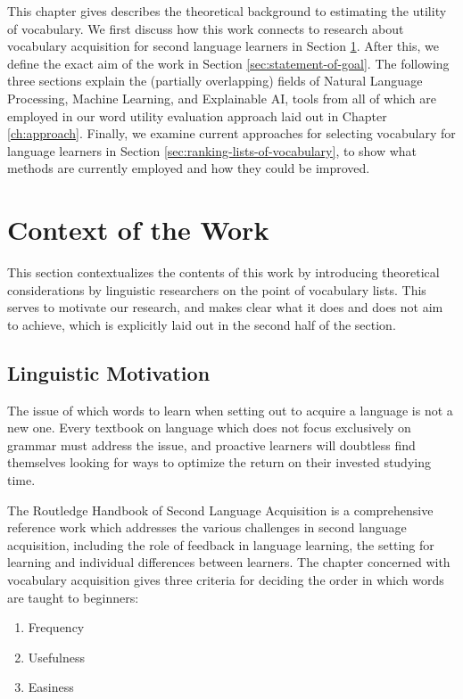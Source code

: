 This chapter gives describes the theoretical background to estimating the utility of vocabulary.
We first discuss how this work connects to research about vocabulary acquisition for second language learners in Section \ref{sec:context-of-work}.
After this, we define the exact aim of the work in Section \ref{sec:statement-of-goal}.
The following three sections explain the (partially overlapping) fields of Natural Language Processing, Machine Learning, and Explainable AI, tools from all of which are employed in our word utility evaluation approach laid out in Chapter \ref{ch:approach}.
Finally, we examine current approaches for selecting vocabulary for language learners in Section \ref{sec:ranking-lists-of-vocabulary}, to show what methods are currently employed and how they could be improved.


\section{Context of the Work} \label{sec:context-of-work}

This section contextualizes the contents of this work by introducing theoretical considerations by linguistic researchers on the point of vocabulary lists.
This serves to motivate our research, and makes clear what it does and does not aim to achieve, which is explicitly laid out in the second half of the section.


\subsection{Linguistic Motivation} \label{sec:linguistic-motivation}
The issue of which words to learn when setting out to acquire a language is not a new one.
Every textbook on language which does not focus exclusively on grammar must address the issue, and proactive learners will doubtless find themselves looking for ways to optimize the return on their invested studying time.

The Routledge Handbook of Second Language Acquisition \cite{liRoutledgeHandbookSecond2022} is a comprehensive reference work which addresses the various challenges in second language acquisition, including the role of feedback in language learning, the setting for learning and individual differences between learners.
The chapter concerned with vocabulary acquisition gives three criteria for deciding the order in which words are taught to beginners:

\begin{enumerate}
	\item Frequency
	\item Usefulness
	\item Easiness
\end{enumerate}

